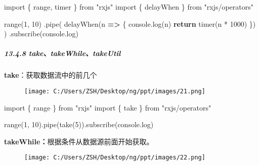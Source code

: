 \documentclass[
]{article}
\newenvironment{Shaded}{}{}
\newcommand{\BuiltInTok}[1]{#1}
\newcommand{\ControlFlowTok}[1]{\textcolor[rgb]{0.00,0.44,0.13}{\textbf{#1}}}
\newcommand{\DecValTok}[1]{\textcolor[rgb]{0.25,0.63,0.44}{#1}}
\newcommand{\FunctionTok}[1]{\textcolor[rgb]{0.02,0.16,0.49}{#1}}
\newcommand{\ImportTok}[1]{#1}
\newcommand{\KeywordTok}[1]{\textcolor[rgb]{0.00,0.44,0.13}{\textbf{#1}}}
\newcommand{\NormalTok}[1]{#1}
\newcommand{\OperatorTok}[1]{\textcolor[rgb]{0.40,0.40,0.40}{#1}}
\newcommand{\StringTok}[1]{\textcolor[rgb]{0.25,0.44,0.63}{#1}}
\begin{document}
\begin{Shaded}
\begin{Highlighting}[]
\ImportTok{import}\NormalTok{ \{ range}\OperatorTok{,}\NormalTok{ timer \} }\ImportTok{from} \StringTok{"rxjs"}
\ImportTok{import}\NormalTok{ \{ delayWhen \} }\ImportTok{from} \StringTok{"rxjs/operators"}

\FunctionTok{range}\NormalTok{(}\DecValTok{1}\OperatorTok{,} \DecValTok{10}\NormalTok{)}
  \OperatorTok{.}\FunctionTok{pipe}\NormalTok{(}
    \FunctionTok{delayWhen}\NormalTok{(n }\KeywordTok{=\textgreater{}}\NormalTok{ \{}
      \BuiltInTok{console}\OperatorTok{.}\FunctionTok{log}\NormalTok{(n)}
      \ControlFlowTok{return} \FunctionTok{timer}\NormalTok{(n }\OperatorTok{*} \DecValTok{1000}\NormalTok{)}
\NormalTok{    \})}
\NormalTok{  )}
  \OperatorTok{.}\FunctionTok{subscribe}\NormalTok{(}\BuiltInTok{console}\OperatorTok{.}\FunctionTok{log}\NormalTok{)}
\end{Highlighting}
\end{Shaded}

\hypertarget{1348-taketakewhiletakeutil}{%
\subparagraph{13.4.8
take、takeWhile、takeUtil}\label{1348-taketakewhiletakeutil}}

\textbf{take}：获取数据流中的前几个

\begin{figure}
\centering
\texttt{[image: C:/Users/ZSH/Desktop/ng/ppt/images/21.png]}
\caption{}
\end{figure}

\begin{Shaded}
\begin{Highlighting}[]
\ImportTok{import}\NormalTok{ \{ range \} }\ImportTok{from} \StringTok{"rxjs"}
\ImportTok{import}\NormalTok{ \{ take \} }\ImportTok{from} \StringTok{"rxjs/operators"}

\FunctionTok{range}\NormalTok{(}\DecValTok{1}\OperatorTok{,} \DecValTok{10}\NormalTok{)}\OperatorTok{.}\FunctionTok{pipe}\NormalTok{(}\FunctionTok{take}\NormalTok{(}\DecValTok{5}\NormalTok{))}\OperatorTok{.}\FunctionTok{subscribe}\NormalTok{(}\BuiltInTok{console}\OperatorTok{.}\FunctionTok{log}\NormalTok{)}
\end{Highlighting}
\end{Shaded}

\textbf{takeWhile：}根据条件从数据源前面开始获取。

\begin{figure}
\centering
\texttt{[image: C:/Users/ZSH/Desktop/ng/ppt/images/22.png]}
\caption{}
\end{figure}
\end{document}

